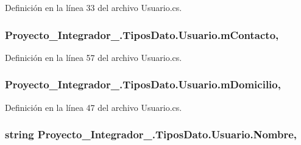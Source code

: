 Definición en la línea 33 del archivo Usuario.\-cs.

\hypertarget{class_proyecto___integrador__3_1_1_tipos_dato_1_1_usuario_a2c64e3cc33009cfc51e7f68fb28024e5}{
\subsubsection[{m\-Contacto}]{ Proyecto\-\_\-\-Integrador\-\_.\-Tipos\-Dato.\-Usuario.\-m\-Contacto\hspace{0.3cm}{\ttfamily [get]}, {\ttfamily [set]}}}\label{class_proyecto___integrador__3_1_1_tipos_dato_1_1_usuario_a2c64e3cc33009cfc51e7f68fb28024e5}


Definición en la línea 57 del archivo Usuario.\-cs.

\hypertarget{class_proyecto___integrador__3_1_1_tipos_dato_1_1_usuario_aa5cabdf3a53f849c78040fc52b58d63f}{
\subsubsection[{m\-Domicilio}]{ Proyecto\-\_\-\-Integrador\-\_.\-Tipos\-Dato.\-Usuario.\-m\-Domicilio\hspace{0.3cm}{\ttfamily [get]}, {\ttfamily [set]}}}\label{class_proyecto___integrador__3_1_1_tipos_dato_1_1_usuario_aa5cabdf3a53f849c78040fc52b58d63f}


Definición en la línea 47 del archivo Usuario.\-cs.

\hypertarget{class_proyecto___integrador__3_1_1_tipos_dato_1_1_usuario_a3e82a41aeb5d99fb13d1d69ed40b1cb9}{
\subsubsection[{Nombre}]{\setlength{\rightskip}{0pt plus 5cm}string Proyecto\-\_\-\-Integrador\-\_.\-Tipos\-Dato.\-Usuario.\-Nombre\hspace{0.3cm}{\ttfamily [get]}, {\ttfamily [set]}}}\label{class_proyecto___integrador__3_1_1_tipos_dato_1_1_usuario_a3e82a41aeb5d99fb13d1d69ed40b1cb9}


